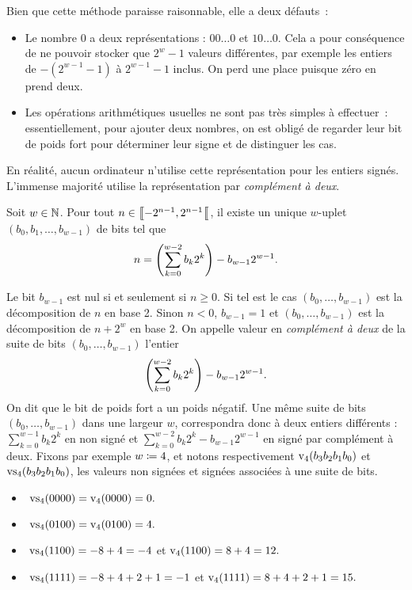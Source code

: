 \documentclass{magnolia}
\begin{document}
Bien que cette méthode paraisse raisonnable, elle a deux défauts~:
\begin{itemize}
  \item Le nombre 0 a deux représentations : $00\dots0$ et $10\dots0$. Cela a pour
  conséquence de ne pouvoir stocker que $2^w - 1$ valeurs différentes, par exemple les entiers
  de $-(2^{w-1} - 1)$ à $2^{w- 1} - 1$ inclus. On perd une place puisque zéro en prend deux.
  \item Les opérations arithmétiques usuelles ne sont pas très simples à effectuer~: essentiellement,
  pour ajouter deux nombres, on est obligé de regarder leur bit de poids fort pour déterminer
  leur signe et de distinguer les cas.
\end{itemize}

En réalité, aucun ordinateur n'utilise cette représentation pour les entiers signés.
L'immense majorité utilise la représentation par \emph{complément à deux}.

\begin{proposition}
Soit $w\in\mathbb{N}$. Pour tout $n\in\left\llbracket -2^{n-1},2^{n-1}\right\llbracket$, il existe un unique $w$-uplet
$(b_0,b_1,\ldots,b_{w-1})$ de bits tel que
\[n=\left(\sum_{k=0}^{w-2} b_k 2^k\right) - b_{w-1}2^{w-1}.\]
\end{proposition}

\begin{remarques}
\remarque Le bit $b_{w-1}$ est nul si et seulement si $n\geq 0$. Si tel est le cas
  $(b_0,\ldots,b_{w-1})$ est la décomposition de $n$ en base 2.
  Sinon $n<0$, $b_{w-1}=1$ et $(b_0,\ldots,b_{w-1})$ est la décomposition de
  $n + 2^w$ en base 2.
\remarque On appelle valeur en \emph{complément à deux} de la suite
de bits $(b_0, \ldots, b_{w-1})$ l'entier
\[\left(\sum_{k=0}^{w-2} b_k 2^k\right) - b_{w-1}2^{w-1}.\]
  On dit que le bit de poids fort a un poids négatif.
\remarque Une même suite de bits $(b_0, \ldots, b_{w-1})$ dans une 
  largeur $w$, correspondra donc à deux entiers différents :
  $\sum_{k = 0}^{w - 1}b_{k} 2^{k}$ en non signé et
  $\sum_{k = 0}^{w - 2}b_{k}2^{k} -b_{w - 1}2^{w - 1}$ en signé par
  complément à deux.
  Fixons par exemple
  $w \coloneqq 4$, et notons respectivement ${\rm v}_{4}(b_{3}b_{2}b_1 b_0)$ et ${\rm vs}_{4}(b_3 b_2 b_1 b_0)$, les
  valeurs non signées et signées associées à une suite de bits.
  \begin{itemize}
    \item $\ {\rm vs}_{4}(0000) = {\rm v}_{4}(0000) = 0.$
    \item $\ {\rm vs}_{4}(0100) = {\rm v}_{4}(0100) = 4.$
    \item $\ {\rm vs}_{4}(1100) = -8 + 4 = -4$ et ${\rm v}_{4}(1100) = 8 + 4 = 12.$
    \item $\ {\rm vs}_{4}(1111) = -8 + 4 + 2 + 1 = -1$ et ${\rm v}_{4}(1111) = 8 + 4 + 2 + 1 = 15.$
  \end{itemize}
\end{remarques}
\end{document}
